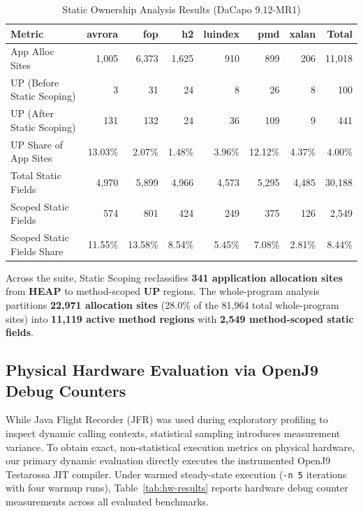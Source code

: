\documentclass[12pt,a4paper]{article}
\newcommand{\UP}{\textbf{UP}}
\newcommand{\HEAP}{\textbf{HEAP}}
\begin{document}
\begin{table}[htbp]
\centering
\caption{Static Ownership Analysis Results (DaCapo 9.12-MR1)}
\label{tab:static-results}
\small
\begin{tabular}{lrrrrrrr}
\toprule
\textbf{Metric} & \textbf{avrora} & \textbf{fop} & \textbf{h2} & \textbf{luindex} & \textbf{pmd} & \textbf{xalan} & \textbf{Total} \\
\midrule
App Alloc Sites & 1{,}005 & 6{,}373 & 1{,}625 & 910 & 899 & 206 & 11{,}018 \\
UP (Before Static Scoping) & 3 & 31 & 24 & 8 & 26 & 8 & 100 \\
UP (After Static Scoping) & 131 & 132 & 24 & 36 & 109 & 9 & 441 \\
UP Share of App Sites & 13.03\% & 2.07\% & 1.48\% & 3.96\% & 12.12\% & 4.37\% & 4.00\% \\
\midrule
Total Static Fields & 4{,}970 & 5{,}899 & 4{,}966 & 4{,}573 & 5{,}295 & 4{,}485 & 30{,}188 \\
Scoped Static Fields & 574 & 801 & 424 & 249 & 375 & 126 & 2{,}549 \\
Scoped Static Fields Share & 11.55\% & 13.58\% & 8.54\% & 5.45\% & 7.08\% & 2.81\% & 8.44\% \\
\bottomrule
\end{tabular}
\end{table}

Across the suite, Static Scoping reclassifies \textbf{341 application allocation sites} from \HEAP{} to method-scoped \UP{} regions. The whole-program analysis partitions \textbf{22{,}971 allocation sites} (28.0\% of the 81{,}964 total whole-program sites) into \textbf{11{,}119 active method regions} with \textbf{2{,}549 method-scoped static fields}.

\subsection{Physical Hardware Evaluation via OpenJ9 Debug Counters}

While Java Flight Recorder (JFR) was used during exploratory profiling to inspect dynamic calling contexts, statistical sampling introduces measurement variance. To obtain exact, non-statistical execution metrics on physical hardware, our primary dynamic evaluation directly executes the instrumented OpenJ9 Testarossa JIT compiler. Under warmed steady-state execution (\texttt{-n 5} iterations with four warmup runs), Table~\ref{tab:hw-results} reports hardware debug counter measurements across all evaluated benchmarks.
\end{document}
